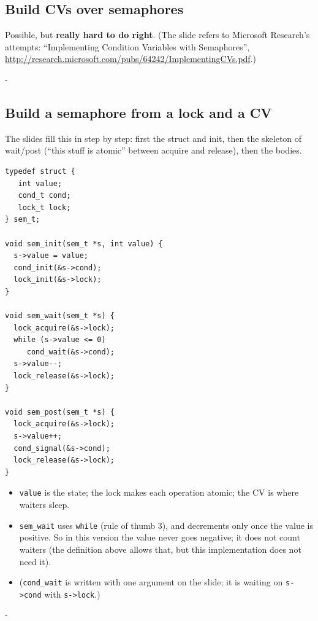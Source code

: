 \documentclass[11pt,a4paper]{article}
\makeatletter
\newcommand{\keepspace}[1]{\par\penalty-100\begingroup
  \setlength{\dimen@}{#1}\dimen@ii\pagegoal\advance\dimen@ii-\pagetotal
  \ifdim\dimen@>\dimen@ii\ifdim\dimen@ii>\z@\vfil\fi\break\fi\endgroup}
\makeatother
\begin{document}
\subsection{Build CVs over semaphores}

Possible, but \textbf{really hard to do right}. (The slide refers to
Microsoft Research's attempts: ``Implementing Condition Variables with
Semaphores'', \url{http://research.microsoft.com/pubs/64242/ImplementingCVs.pdf}.)

\keepspace{20\baselineskip}
\subsection{Build a semaphore from a lock and a CV}

The slides fill this in step by step: first the struct and init, then the
skeleton of wait/post (``this stuff is atomic'' between acquire and
release), then the bodies.

\begin{lstlisting}
typedef struct {
   int value;
   cond_t cond;
   lock_t lock;
} sem_t;

void sem_init(sem_t *s, int value) {
  s->value = value;
  cond_init(&s->cond);
  lock_init(&s->lock);
}

void sem_wait(sem_t *s) {
  lock_acquire(&s->lock);
  while (s->value <= 0)
     cond_wait(&s->cond);
  s->value--;
  lock_release(&s->lock);
}

void sem_post(sem_t *s) {
  lock_acquire(&s->lock);
  s->value++;
  cond_signal(&s->cond);
  lock_release(&s->lock);
}
\end{lstlisting}

\begin{itemize}
  \item \texttt{value} is the state; the lock makes each operation atomic;
        the CV is where waiters sleep.
  \item \texttt{sem\_wait} uses \texttt{while} (rule of thumb 3), and
        decrements only once the value is positive. So in this version the
        value never goes negative; it does not count waiters (the
        definition above allows that, but this implementation does not need
        it).
  \item (\texttt{cond\_wait} is written with one argument on the slide; it
        is waiting on \texttt{s->cond} with \texttt{s->lock}.)
\end{itemize}

\keepspace{28\baselineskip}
\end{document}
